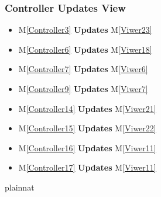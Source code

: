 \documentclass[12pt, titlepage]{article}
\newcommand{\mref}[1]{M\ref{#1}}
\begin{document}
\renewcommand{\vb}{\textbf{Updates }}
\subsubsection{Controller Updates View}
\begin{itemize}
\item \mref{Controller3} \vb  \mref{Viwer23}
\item \mref{Controller6} \vb  \mref{Viwer18}
\item \mref{Controller7} \vb  \mref{Viwer6}
\item \mref{Controller9} \vb  \mref{Viwer7}
\item \mref{Controller14} \vb  \mref{Viwer21}
\item \mref{Controller15} \vb  \mref{Viwer22}
\item \mref{Controller16} \vb  \mref{Viwer11}
\item \mref{Controller17} \vb  \mref{Viwer11}
\end{itemize}
\newpage
 {plainnat}

\end{document}
